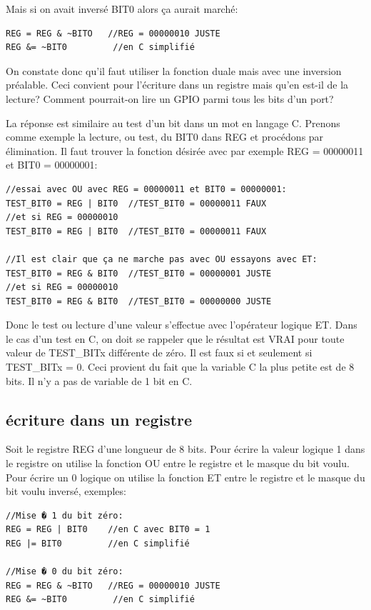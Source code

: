 Mais si on avait inversé BIT0 alors ça aurait marché:

\lstset{style=customc}
\begin{lstlisting}
REG = REG & ~BITO   //REG = 00000010 JUSTE 
REG &= ~BIT0         //en C simplifié
\end{lstlisting}

On constate donc qu'il faut utiliser la fonction duale mais avec une inversion préalable. Ceci convient pour l'écriture dans un registre mais qu'en est-il de la lecture? Comment pourrait-on lire un GPIO parmi tous les bits d'un port?

La réponse est similaire au test d'un bit dans un mot en langage C. Prenons comme exemple la lecture, ou test, du BIT0 dans REG et procédons par élimination. Il faut trouver la fonction désirée avec par exemple REG = 00000011 et BIT0 = 00000001:

\lstset{style=customc}
\begin{lstlisting}
//essai avec OU avec REG = 00000011 et BIT0 = 00000001:
TEST_BIT0 = REG | BIT0  //TEST_BIT0 = 00000011 FAUX
//et si REG = 00000010
TEST_BIT0 = REG | BIT0  //TEST_BIT0 = 00000011 FAUX

//Il est clair que ça ne marche pas avec OU essayons avec ET:
TEST_BIT0 = REG & BIT0  //TEST_BIT0 = 00000001 JUSTE
//et si REG = 00000010
TEST_BIT0 = REG & BIT0  //TEST_BIT0 = 00000000 JUSTE
\end{lstlisting}

Donc le test ou lecture d'une valeur s'effectue avec l'opérateur logique ET. Dans le cas d'un test en C, on doit se rappeler que le résultat est VRAI pour toute valeur de TEST\_BITx différente de zéro. Il est faux si et seulement si TEST\_BITx = 0. Ceci provient du fait que la variable C la plus petite est de 8 bits. Il n'y a pas de variable de 1 bit en C. 

\subsection{écriture dans un registre}

Soit le registre REG d'une longueur de 8 bits. Pour écrire la valeur logique 1 dans le registre on utilise la fonction OU entre le registre et le masque du bit voulu. Pour écrire un 0 logique on utilise la fonction ET entre le registre et le masque du bit voulu inversé, exemples:

\lstset{style=customc}
\begin{lstlisting}
//Mise � 1 du bit zéro:
REG = REG | BIT0    //en C avec BIT0 = 1
REG |= BIT0		    //en C simplifié

//Mise � 0 du bit zéro:
REG = REG & ~BITO   //REG = 00000010 JUSTE 
REG &= ~BIT0         //en C simplifié
\end{lstlisting}

